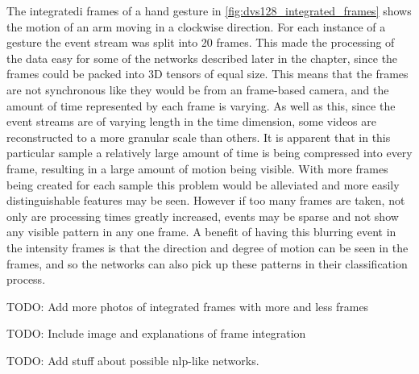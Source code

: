 The integratedi frames of a hand gesture in \cref{fig:dvs128_integrated_frames} shows the motion of an arm moving in a clockwise direction. For each instance of a gesture the event stream was split into 20 frames. This made the processing of the data easy for some of the networks described later in the chapter, since the frames could be packed into 3D tensors of equal size. This means that the frames are not synchronous like they would be from an frame-based camera, and the amount of time represented by each frame is varying. As well as this, since the event streams are of varying length in the time dimension, some videos are reconstructed to a more granular scale than others. It is apparent that in this particular sample a relatively large amount of time is being compressed into every frame, resulting in a large amount of motion being visible. With more frames being created for each sample this problem would be alleviated and more easily distinguishable features may be seen. However if too many frames are taken, not only are processing times greatly increased, events may be sparse and not show any visible pattern in any one frame. A benefit of having this blurring event in the intensity frames is that the direction and degree of motion can be seen in the frames, and so the networks can also pick up these patterns in their classification process.

\color{red} TODO: Add more photos of integrated frames with more and less frames \color{black}

\color{red} TODO: Include image and explanations of frame integration \color{black}

\color{red} TODO: Add stuff about possible nlp-like networks. \color{black}

